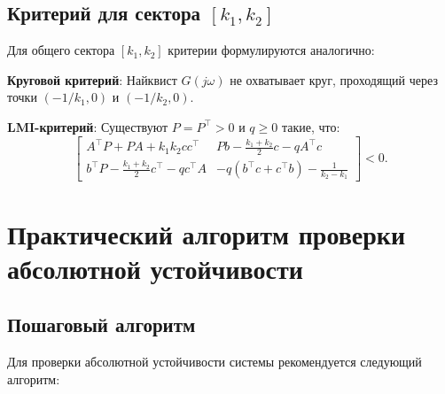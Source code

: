 \section{Критерий для сектора $[k_1, k_2]$}

Для общего сектора $[k_1, k_2]$ критерии формулируются аналогично:

\textbf{Круговой критерий}: Найквист $G(j\omega)$ не охватывает круг, проходящий через точки $(-1/k_1, 0)$ и $(-1/k_2, 0)$.

\textbf{LMI-критерий}: Существуют $P=P^\top>0$ и $q\ge 0$ такие, что:
\begin{equation}
    \begin{bmatrix}
        A^\top P + P A + k_1 k_2 c c^\top & P b - \frac{k_1+k_2}{2}c - q A^\top c\\
        b^\top P - \frac{k_1+k_2}{2}c^\top - q c^\top A & -q(b^\top c + c^\top b) - \frac{1}{k_2-k_1}
    \end{bmatrix} < 0.
\end{equation}

\chapter{Практический алгоритм проверки абсолютной устойчивости}

\section{Пошаговый алгоритм}

Для проверки абсолютной устойчивости системы рекомендуется следующий алгоритм:

